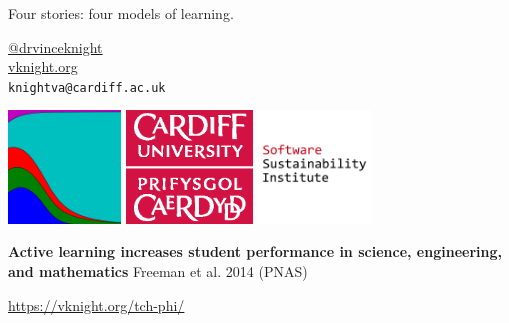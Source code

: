 \documentclass{beamer}
\begin{document}
    \begin{frame}
        \begin{center}
            \Large

            Four stories: four models of learning.

            \normalsize
            \vspace{1cm}
            \href{https://twitter.com/drvinceknight}{@drvinceknight}\\
            \url{vknight.org}\\
            \texttt{knightva@cardiff.ac.uk}
        \end{center}


    \end{frame}

    \begin{frame}
        \centering

        \includegraphics[height=3cm]{static/axelrod_logo.png}
        \hfill
        \includegraphics[height=3cm]{static/CUident_CMYK.eps}
        \hfill
        \includegraphics[height=3cm]{static/ssi-logo.png}
    \end{frame}

    \begin{frame}
        \begin{center}
            \textbf{Active learning increases student performance in
            science, engineering, and mathematics} Freeman et al. 2014 (PNAS)
        \end{center}

        \begin{center}
            \url{https://vknight.org/tch-phi/}
        \end{center}
    \end{frame}
\end{document}
